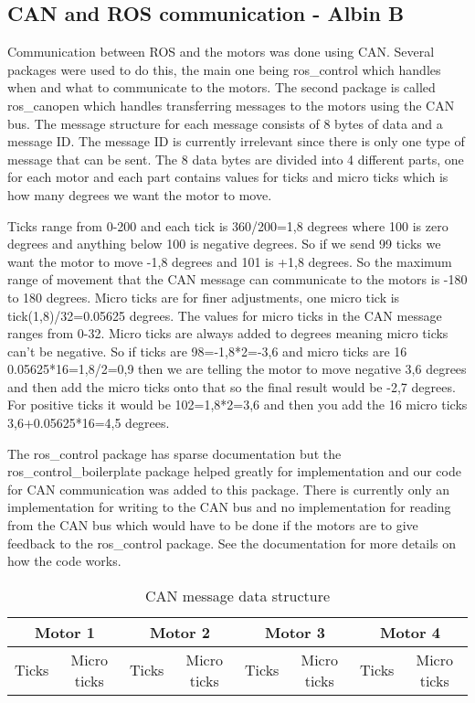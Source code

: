\subsection{CAN and ROS communication - Albin B}
Communication between ROS and the motors was done using CAN. Several packages were used to do this, the main one being ros\_control which handles when and what to communicate to the motors. The second package is called ros\_canopen which handles transferring messages to the motors using the CAN bus. The message structure for each message consists of 8 bytes of data and a message ID. The message ID is currently irrelevant since there is only one type of message that can be sent. The 8 data bytes are divided into 4 different parts, one for each motor and each part contains values for ticks and micro ticks which is how many degrees we want the motor to move.

Ticks range from 0-200 and each tick is 360/200=1,8 degrees where 100 is zero degrees and anything below 100 is negative degrees. So if we send 99 ticks we want the motor to move -1,8 degrees and 101 is +1,8 degrees. So the maximum range of movement that the CAN message can communicate to the motors is -180 to 180 degrees. Micro ticks are for finer adjustments, one micro tick is tick(1,8)/32=0.05625 degrees. The values for micro ticks in the CAN message ranges from 0-32. Micro ticks are always added to degrees meaning micro ticks can't be negative. So if ticks are 98=-1,8*2=-3,6 and micro ticks are 16 0.05625*16=1,8/2=0,9 then we are telling the motor to move negative 3,6 degrees and then add the micro ticks onto that so the final result would be -2,7 degrees. For positive ticks it would be 102=1,8*2=3,6 and then you add the 16 micro ticks 3,6+0.05625*16=4,5 degrees.

The ros\_control package has sparse documentation but the ros\_control\_boilerplate package helped greatly for implementation and our code for CAN communication was added to this package. There is currently only an implementation for writing to the CAN bus and no implementation for reading from the CAN bus which would have to be done if the motors are to give feedback to the ros\_control package. See the documentation for more details on how the code works.

\begin{table}[!ht]
\centering
\caption{CAN message data structure}
\label{my-label}
\begin{tabular}{|c|c|c|c|c|c|c|c|}
\hline
\multicolumn{2}{|c|}{Motor 1} & \multicolumn{2}{c|}{Motor 2} & \multicolumn{2}{c|}{Motor 3} & \multicolumn{2}{c|}{Motor 4} \\ \hline
Ticks       & Micro ticks      & Ticks      & Micro ticks      & Ticks      & Micro ticks      & Ticks      & Micro ticks      \\ \hline
\end{tabular}
\end{table}



